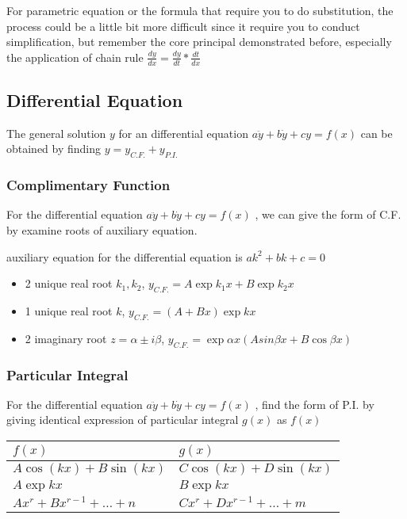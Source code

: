 \documentclass[]{article}
\begin{document}
For parametric equation or the formula that require you to do
substitution, the process could be a little bit more difficult since it
require you to conduct simplification, but remember the core principal
demonstrated before, especially the application of chain rule
\(\frac{dy}{dx} = \frac{dy}{dt} * \frac{dt}{dx}\)

\subsection{Differential Equation}\label{header-n922}

The general solution \(y\) for an differential equation
\(a\ddot{y} + b\dot{y} + cy = f(x)\) can be obtained by finding
\(y = y_{C.F.} + y_{P.I.}\)

\subsubsection{Complimentary Function}\label{header-n925}

For the differential equation \(a\ddot{y} + b\dot{y} + cy = f(x)\) , we
can give the form of C.F. by examine roots of auxiliary equation.

auxiliary equation for the differential equation is
\(ak^2 + bk + c = 0\)

\begin{itemize}
\item
  2 unique real root \(k_1,k_2\), \(y_{C.F.} = A\exp{k_1x}+B\exp{k_2x}\)
\item
  1 unique real root \(k\), \(y_{C.F.} = (A+Bx)\exp{kx}\)
\item
  2 imaginary root \(z = \alpha \pm i\beta \),
  \(y_{C.F.} = \exp{\alpha x}(Asin\beta x + B\cos\beta x)\)
\end{itemize}

\subsubsection{Particular Integral}\label{header-n940}

For the differential equation \(a\ddot{y} + b\dot{y} + cy = f(x)\) ,
find the form of P.I. by giving identical expression of particular
integral \(g(x)\) as \(f(x)\)

\begin{longtable}[]{@{}ll@{}}
\toprule
\(f(x)\) & \(g(x)\)\tabularnewline
\midrule
\endhead
\(A\cos(kx) + B\sin(kx)\) & \(C\cos(kx) + D\sin(kx)\)\tabularnewline
\(A\exp{kx}\) & \(B\exp{kx}\)\tabularnewline
\(Ax^r + Bx^{r-1} + \dots + n\) &
\(Cx^r + Dx^{r-1} + \dots + m\)\tabularnewline
\bottomrule
\end{longtable}
\end{document}

